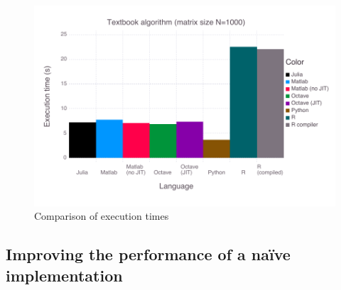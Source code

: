 \begin{figure}
	\includegraphics[width=\textwidth]{data/fig-lang}
	\caption{Comparison of execution times }
	\label{fig:naivelangs}
\end{figure}



\subsection{Improving the performance of a na\"ive implementation}


